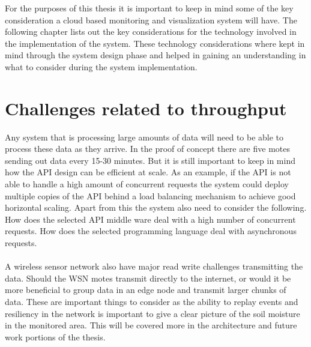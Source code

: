 \documentclass[]{uiophd}
\begin{document}
For the purposes of this thesis it is important to keep in mind some of the key consideration a cloud based monitoring and visualization system will have. The following chapter lists out the key considerations for the technology involved in the implementation of the system. These technology considerations where kept in mind through the system design phase and helped in gaining an understanding in what to consider during the system implementation.


\section{Challenges related to throughput}

Any system that is processing large amounts of data will need to be able to process these data as they arrive. In the proof of concept there are five motes sending out data every 15-30 minutes. But it is still important to keep in mind how the API design can be efficient at scale. As an example, if the API is not able to handle a high amount of concurrent requests the system could deploy multiple copies of the API behind a load balancing mechanism to achieve good horizontal scaling. Apart from this the system also need to consider the following. How does the selected API middle ware deal with a high number of concurrent requests. How does the selected programming language deal with asynchronous requests.
\\\\
A wireless sensor network also have major read write challenges transmitting the data. Should the WSN motes transmit directly to the internet, or would it be more beneficial to group data in an edge node and transmit larger chunks of data. These are important things to consider as the ability to replay events and resiliency in the network is important to give a clear picture of the soil moisture in the monitored area. This will be covered more in the architecture and future work portions of the thesis.
\end{document}
